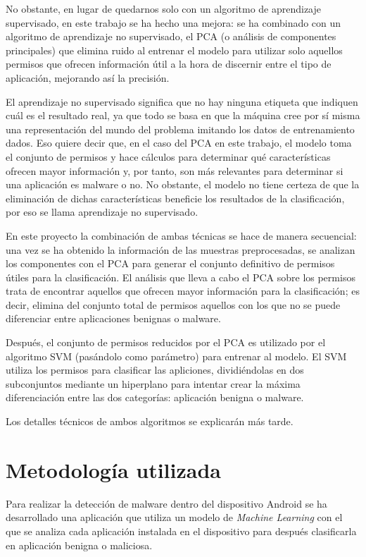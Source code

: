 No obstante, en lugar de quedarnos solo con un algoritmo de aprendizaje supervisado, en este trabajo se ha hecho una mejora: se ha combinado con un algoritmo de aprendizaje no supervisado, el PCA (o análisis de componentes principales) que elimina ruido al entrenar el modelo para utilizar solo aquellos permisos que ofrecen información útil a la hora de discernir entre el tipo de aplicación, mejorando así la precisión.

El aprendizaje no supervisado significa que no hay ninguna etiqueta que indiquen cuál es el resultado real, ya que todo se basa en que la máquina cree por sí misma una representación del mundo del problema imitando los datos de entrenamiento dados. Eso quiere decir que, en el caso del PCA en este trabajo, el modelo toma el conjunto de permisos y hace cálculos para determinar qué características ofrecen mayor información y, por tanto, son más relevantes para determinar si una aplicación es malware o no. No obstante, el modelo no tiene certeza de que la eliminación de dichas características beneficie los resultados de la clasificación, por eso se llama aprendizaje no supervisado\hypersetup{citecolor=red}\cite{unsup}.

En este proyecto la combinación de ambas técnicas se hace de manera secuencial: una vez se ha obtenido la información de las muestras preprocesadas, se analizan los componentes con el PCA para generar el conjunto definitivo de permisos útiles para la clasificación. El análisis que lleva a cabo el PCA sobre los permisos trata de encontrar aquellos que ofrecen mayor información para la clasificación; es decir, elimina del conjunto total de permisos aquellos con los que no se puede diferenciar entre aplicaciones benignas o malware.

Después, el conjunto de permisos reducidos por el PCA es utilizado por el algoritmo SVM (pasándolo como parámetro) para entrenar al modelo. El SVM utiliza los permisos para clasificar las apliciones, dividiéndolas en dos subconjuntos mediante un hiperplano para intentar crear la máxima diferenciación entre las dos categorías: aplicación benigna o malware.

Los detalles técnicos de ambos algoritmos se explicarán más tarde.

\section{Metodología utilizada}

Para realizar la detección de malware dentro del dispositivo Android se ha desarrollado una aplicación que utiliza un modelo de \textit{Machine Learning} con el que se analiza cada aplicación instalada en el dispositivo para después clasificarla en aplicación benigna o maliciosa.

